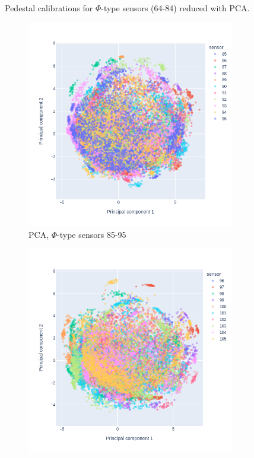 \begin{figure}
\caption[All calibrationd]{Pedestal calibrations for $\Phi$-type sensors (64-84) reduced with PCA.}
    \label{plot:pca_all_ped_phia}
\end{figure}

 \begin{figure}
\centering
\begin{subfigure}[b]{0.7\textwidth}
    \centering
    \includegraphics[width=\linewidth]{figures/chapter4/dimred/PCA_pedestals_phi_2.png}
    \caption{PCA, $\Phi$-type sensors 85-95}
    \label{plot:PCA_pedestals_2_phi}
  \end{subfigure}
\begin{subfigure}[b]{0.7\textwidth}
    \centering
    \includegraphics[width=\linewidth]{figures/chapter4/dimred/PCA_pedestals_phi_3.png}

\end{subfigure}
\end{figure}
